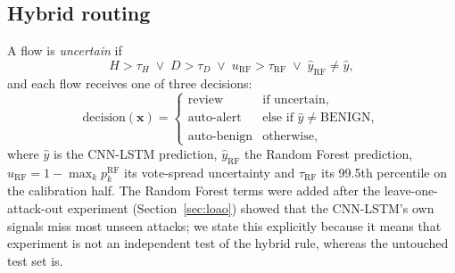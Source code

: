 \documentclass[conference]{IEEEtran}
\begin{document}
\subsection{Hybrid routing}
A flow is \emph{uncertain} if
\begin{equation}
H>\tau_H \;\lor\; D>\tau_D \;\lor\; u_{\mathrm{RF}}>\tau_{\mathrm{RF}} \;\lor\; \hat{y}_{\mathrm{RF}}\neq\hat{y},
\end{equation}
and each flow receives one of three decisions:
\begin{equation}
\text{decision}(\mathbf{x}) =
\begin{cases}
\text{review} & \text{if uncertain},\\
\text{auto-alert} & \text{else if } \hat{y}\neq\text{BENIGN},\\
\text{auto-benign} & \text{otherwise,}
\end{cases}
\end{equation}
where $\hat{y}$ is the CNN-LSTM prediction, $\hat{y}_{\mathrm{RF}}$ the Random Forest prediction,
$u_{\mathrm{RF}} = 1-\max_k p^{\mathrm{RF}}_k$ its vote-spread uncertainty and $\tau_{\mathrm{RF}}$ its
99.5th percentile on the calibration half. The Random Forest terms were added after the
leave-one-attack-out experiment (Section~\ref{sec:loao}) showed that the CNN-LSTM's own signals
miss most unseen attacks; we state this explicitly because it means that experiment is not an
independent test of the hybrid rule, whereas the untouched test set is.
\end{document}
